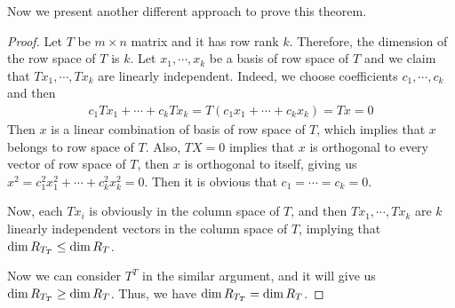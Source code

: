 \documentclass[11pt]{book}
\theoremstyle{definition}
\numberwithin{equation}{subsection}
\begin{document}
Now we present another different approach to prove this theorem.

\begin{proof}
Let $T$ be $m\times n$ matrix and it has row rank $k$. Therefore, the dimension of the row space of $T$ is $k$. Let $x_1,\cdots,x_k$ be a basis of row space of $T$ and we claim that $Tx_1,\cdots, Tx_k$ are linearly independent. Indeed, we choose coefficients $c_1,\cdots,c_k$ and then 
\begin{align*}
    c_1 Tx_1 + \cdots + c_k Tx_k = T(c_1x_1 +\cdots + c_kx_k) = Tx = 0
\end{align*}
Then $x$ is a linear combination of basis of row space of $T$, which implies that $x$ belongs to row space of $T$. Also, $TX = 0$ implies that $x$ is orthogonal to every vector of row space of $T$, then $x$ is orthogonal to itself, giving us $x^2 = c_1^2 x_1^2 + \cdots + c_k^2 x_k^2 = 0$. Then it is obvious that $c_1 = \cdots = c_k = 0$.

Now, each $Tx_i$ is obviously in the column space of $T$, and then $Tx_1,\cdots, Tx_k$ are $k$ linearly independent vectors in the column space of $T$, implying that ${\rm dim}\, R_{T_T}\leq {\rm dim}\,R_T$. 

Now we can consider $T^T$ in the similar argument, and it will give us ${\rm dim}\, R_{T_T}\geq {\rm dim}\,R_T$. Thus, we have ${\rm dim}\, R_{T_T} = {\rm dim}\,R_T$. 
\end{proof}

\medskip
\end{document}
